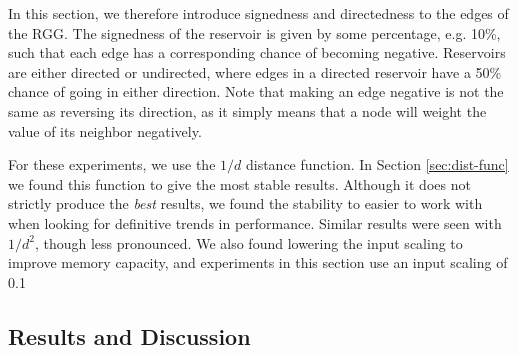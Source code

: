 In this section, we therefore introduce signedness and directedness to the edges
of the RGG. The signedness of the reservoir is given by some percentage,
e.g. 10\%, such that each edge has a corresponding chance of becoming
negative. Reservoirs are either directed or undirected, where edges in a
directed reservoir have a 50\% chance of going in either direction. Note that
making an edge negative is not the same as reversing its direction, as it simply
means that a node will weight the value of its neighbor negatively.

For these experiments, we use the $1/d$ distance function. In Section
\ref{sec:dist-func} we found this function to give the most stable
results. Although it does not strictly produce the \textit{best} results, we
found the stability to easier to work with when looking for definitive trends in
performance. Similar results were seen with $1/d^2$, though less pronounced. We
also found lowering the input scaling to improve memory capacity, and
experiments in this section use an input scaling of 0.1

\subsection{Results and Discussion}

